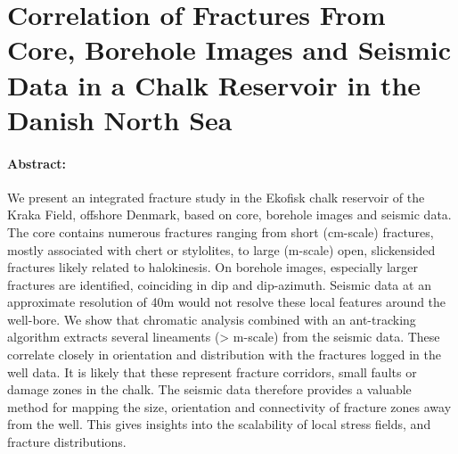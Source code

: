 \section{Correlation of Fractures From Core, Borehole Images and Seismic Data in a Chalk Reservoir in the Danish North Sea}
\label{seg:talaEAGE}
\paragraph{Abstract:} We present an integrated fracture study in the Ekofisk chalk reservoir of the Kraka Field, offshore Denmark, based on core, borehole images and seismic data. The core contains numerous fractures ranging from short (cm-scale) fractures, mostly associated with chert or stylolites, to large (m-scale) open, slickensided fractures likely related to halokinesis. On borehole images, especially larger fractures are identified, coinciding in dip and dip-azimuth. Seismic data at an approximate resolution of 40m would not resolve these local features around the well-bore. We show that chromatic analysis combined with an ant-tracking algorithm extracts several lineaments (> m-scale) from the seismic data. These correlate closely in orientation and distribution with the fractures logged in the well data. It is likely that these represent fracture corridors, small faults or damage zones in the chalk. The seismic data therefore provides a valuable method for mapping the size, orientation and connectivity of fracture zones away from the well. This gives insights into the scalability of local stress fields, and fracture distributions. 

{\vfill\hfill\newline{}}



